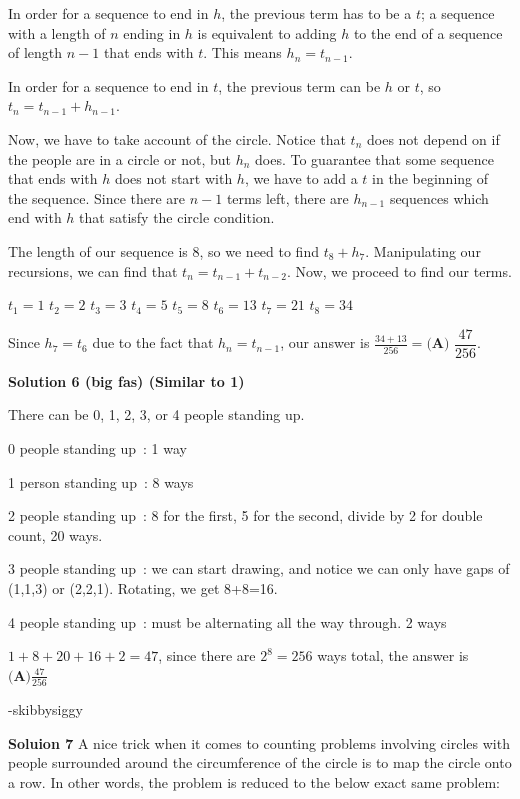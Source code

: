 \begin{enumerate}
 In order for a sequence to end in $h$, the previous term has to be a $t$; a sequence with a length of $n$ ending in $h$ is equivalent to adding $h$ to the end of a sequence of length $n-1$ that ends with $t$. This means $h_n=t_{n-1}$. 

 In order for a sequence to end in $t$, the previous term can be $h$ or $t$, so $t_n=t_{n-1}+h_{n-1}$.

 Now, we have to take account of the circle. Notice that $t_n$ does not depend on if the people are in a circle or not, but $h_n$ does. To guarantee that some sequence that ends with $h$ does not start with $h$, we have to add a $t$ in the beginning of the sequence. Since there are $n-1$ terms left, there are $h_{n-1}$ sequences which end with $h$ that satisfy the circle condition.

 The length of our sequence is $8$, so we need to find $t_8+h_7$. Manipulating our recursions, we can find that $t_n=t_{n-1}+t_{n-2}$. Now, we proceed to find our terms.

 $t_1=1$
$t_2=2$
$t_3=3$
$t_4=5$
$t_5=8$
$t_6=13$
$t_7=21$
$t_8=34$

 Since $h_7=t_6$ due to the fact that $h_n=t_{n-1}$, our answer is $\frac{34+13}{256}=\boxed{\textbf{(A) } \dfrac{47}{256}}$.

 



\textbf{Solution 6 (big fas) (Similar to 1)}

There can be 0, 1, 2, 3, or 4 people standing up. 

 0 people standing up : 1 way

 
1 person standing up : 8 ways

 
2 people standing up : 8 for the first, 5 for the second, divide by 2 for double count, 20 ways.

 
3 people standing up : we can start drawing, and notice we can only have gaps of (1,1,3) or (2,2,1). Rotating, we get 8+8=16.

 
4 people standing up : must be alternating all the way through. 2 ways

 $1+8+20+16+2 = 47$, since there are $2^8=256$ ways total, the answer is $\boxed{\textbf{(A)}\frac{47}{256}}$

 -skibbysiggy

 \textbf{Soluion 7} A nice trick when it comes to counting problems involving circles with people surrounded around the circumference of the circle is to map the circle onto a row. In other words, the problem is reduced to the below exact same problem:


\end{enumerate}
